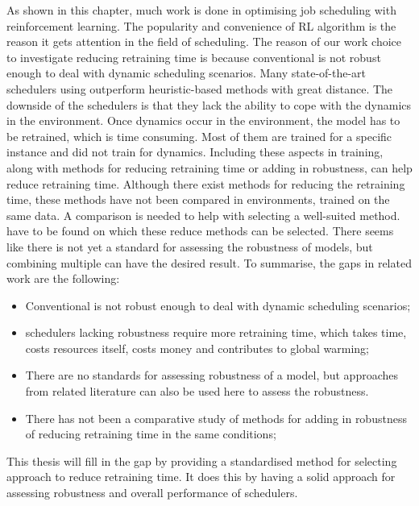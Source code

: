 As shown in this chapter, much work is done in optimising job scheduling with
reinforcement learning. The popularity and convenience of RL algorithm is the
reason it gets attention in the field of scheduling. The reason of our work
choice to investigate reducing retraining time is because conventional \rl is
not robust enough to deal with dynamic scheduling scenarios. Many
state-of-the-art schedulers using \rl outperform heuristic-based methods with
great distance. The downside of the \rlbased schedulers is that they lack the
ability to cope with the dynamics in the environment. Once dynamics occur in
the environment, the \rl model has to be retrained, which is time consuming.
Most of them are trained for a specific instance and did not train for
dynamics. Including these aspects in training, along
with methods for reducing retraining time or adding in robustness, can help
reduce retraining time. Although there exist methods for reducing the
retraining time, these methods have not been compared in \jss environments,
trained on the same data. A comparison is needed to help with selecting a
well-suited method. \kpis have to be found on which these reduce methods can
be selected. There seems like there is not yet a standard for assessing the
robustness of models, but combining multiple can have the desired result. To
summarise, the gaps in related work are the following:
\begin{itemize}[noitemsep]
    \item Conventional \rl is not robust enough to deal with dynamic
        scheduling scenarios;
    \item \rlbased schedulers lacking robustness require more retraining time,
        which takes time, costs resources itself, costs money and contributes
        to global warming;
    \item There are no standards for assessing robustness of a model, but
        approaches from related literature can also be used here to assess
        the robustness.
    \item There has not been a comparative study of methods for adding in
        robustness of reducing retraining time in the same conditions;
\end{itemize}
This thesis will fill in the gap by providing a standardised method for
selecting approach to reduce retraining time. It does this by having a solid
approach for assessing robustness and overall performance of \rlbased
schedulers.
